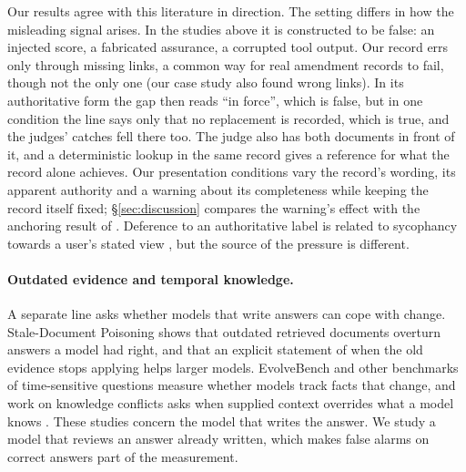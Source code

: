 Our results agree with this literature in direction. The setting differs in how the misleading signal arises. In the
studies above it is constructed to be false: an injected score, a fabricated assurance, a corrupted tool output. Our
record errs only through missing links, a common way for real amendment records to fail, though not the only one
(our case study also found wrong links). In its authoritative form the gap
then reads ``in force'', which is false, but in one condition the line says only that no replacement is recorded,
which is true, and the judges' catches fell there too. The
judge also has both documents in front of it, and a deterministic lookup in the same record gives a reference for what
the record alone achieves. Our presentation conditions vary the record's wording, its apparent authority and a
warning about its completeness while keeping the record itself fixed; \S\ref{sec:discussion} compares the warning's
effect with the anchoring result of \citet{kapetanovic2026anchoring}. Deference to an authoritative label is related
to sycophancy towards a user's stated view \citep{sharma2023sycophancy}, but the source of the pressure is different.

\paragraph{Outdated evidence and temporal knowledge.}
A separate line asks whether models that write answers can cope with change. Stale-Document Poisoning
\citep{staledoc2026} shows that outdated retrieved documents overturn answers a model had right, and that an explicit
statement of when the old evidence stops applying helps larger models. EvolveBench \citep{zhu2025evolvebench} and
other benchmarks of time-sensitive questions \citep{chen2021timeqa,zhang2021situatedqa,vu2024freshllms,ouyang2025hoh}
measure whether models track facts that change, and work on knowledge conflicts asks when supplied context overrides
what a model knows \citep{xie2024chameleon,xu2024knowledge,wu2024clasheval}. These studies concern the model that
writes the answer. We study a model that reviews an answer already written, which makes false alarms on correct answers
part of the measurement.


